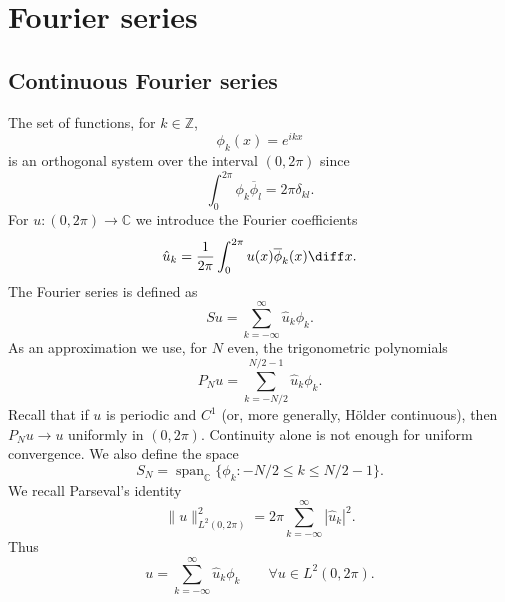 \section{Fourier series}

\subsection{Continuous Fourier series}
The set of functions, for $k \in \mathbb Z$,
\begin{equation*}
    \phi_k(x) = e^{ikx}
\end{equation*}
is an orthogonal system over the interval $(0,2\pi)$ since
\begin{equation*}
    \int_0^{2\pi} \phi_k \overline \phi_l = 2\pi \delta_{kl}.
\end{equation*}
For $u : (0,2\pi) \to \mathbb C$ we introduce the Fourier coefficients
\begin{equation*}
    \hat u_k = \frac 1 {2\pi} \int_0^{2\pi} u(x) \overline \phi_k(x) \diff x.
\end{equation*}
The Fourier series is defined as
\begin{equation*}
    Su = \sum_{k=-\infty}^\infty \hat u_k \phi_k.
\end{equation*}
As an approximation we use, for $N$ even, the trigonometric polynomials
\begin{equation*}
    P_N u = \sum_{k=-N/2}^{N/2-1} \hat u_k \phi_k.
\end{equation*}
Recall that if $u$ is periodic and $C^1$ (or, more generally, Hölder continuous), then $P_N u \to u$ uniformly in $(0,2\pi)$. Continuity alone is not enough for uniform convergence.
We also define the space
\begin{equation*}
    S_N = \operatorname{span}_{\mathbb C} \{ \phi_k : -N/2 \le k \le N/2 - 1\}.
\end{equation*}
We recall Parseval's identity
\begin{equation*}
    \| u \|_{L^2(0,2\pi)}^2 = 2 \pi \sum_{k=-\infty}^\infty |\hat u_k|^2.
\end{equation*}
Thus
\begin{equation*}
    u = \sum_{k=-\infty}^\infty \hat u_k \phi_k \qquad \forall u \in L^2(0,2\pi).
\end{equation*}

